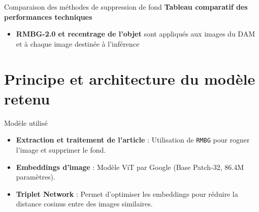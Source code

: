 \documentclass{beamer}
\begin{document}
\begin{frame}{Comparaison des méthodes de suppression de fond}
    \textbf{Tableau comparatif des performances techniques}
    \begin{table}[]
        \centering
        \caption{Comparaison entre U2Net et RMBG-2.0}
    \end{table}
    \begin{itemize}
        \item \textbf{RMBG-2.0 et recentrage de l'objet} sont appliqués aux images du DAM et à chaque image destinée à l'inférence
    \end{itemize}
\end{frame}

\section{Principe et architecture du modèle retenu}
\begin{frame}{Modèle utilisé}
\begin{itemize}
    \item \textbf{Extraction et traitement de l'article} : Utilisation de \texttt{RMBG} pour rogner l'image et supprimer le fond. 
    \item \textbf{Embeddings d'image} : Modèle ViT par Google (Base Patch-32, 86.4M paramètres).
    \item \textbf{Triplet Network} : Permet d'optimiser les embeddings pour réduire la distance cosinus entre des images similaires.
\end{itemize}
\end{frame}
\end{document}
